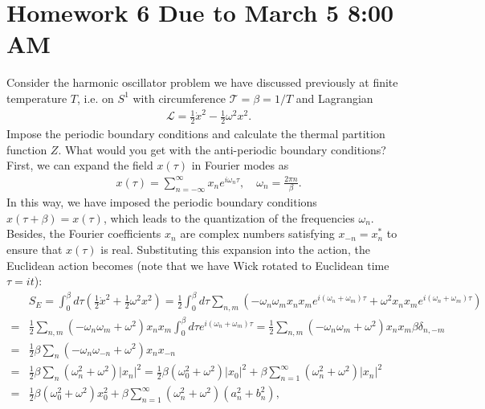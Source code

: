 \section*{Homework 6 Due to March 5 8:00 AM}
Consider the harmonic oscillator problem we have discussed previously at finite temperature $T$, i.e. on $S^1$ with circumference $\mathcal{T}=\beta = 1/T$ and Lagrangian 
\begin{align}
    \mathcal{L} = \frac{1}{2} \dot{x}^2 - \frac{1}{2} \omega^2 x^2.    
\end{align}
Impose the periodic boundary conditions and calculate the thermal partition function $Z$. What would you get with the anti-periodic boundary conditions?
\answer{}
First, we can expand the field $x(\tau)$ in Fourier modes as
\begin{align}
    x(\tau) = \sum_{n=-\infty}^{\infty} x_n e^{i \omega_n \tau}, \quad \omega_n = \frac{2\pi n}{\beta}.
\end{align}
In this way, we have imposed the periodic boundary conditions $x(\tau + \beta) = x(\tau)$, which leads to the quantization of the frequencies $\omega_n$. Besides, the Fourier coefficients $x_n$ are complex numbers satisfying $x_{-n} = x_n^*$ to ensure that $x(\tau)$ is real. Substituting this expansion into the action, the Euclidean action becomes (note that we have Wick rotated to Euclidean time $\tau = it$):
\begin{align}
    &S_E = \int_0^\beta d\tau \left( \frac{1}{2} \dot{x}^2 + \frac{1}{2} \omega^2 x^2 \right) = \frac{1}{2} \int_0^\beta d\tau \sum_{n,m} \left( -\omega_n \omega_m x_n x_m e^{i (\omega_n + \omega_m) \tau} + \omega^2 x_n x_m e^{i (\omega_n + \omega_m) \tau} \right) \\
    =& \frac{1}{2} \sum_{n,m} \left( -\omega_n \omega_m + \omega^2 \right) x_n x_m \int_0^\beta d\tau e^{i (\omega_n + \omega_m) \tau} = \frac{1}{2} \sum_{n,m} \left( -\omega_n \omega_m + \omega^2 \right) x_n x_m \beta \delta_{n,-m} \\
    =& \frac{1}{2}\beta \sum_{n}\left( -\omega_n \omega_{-n} + \omega^2 \right) x_n x_{-n} \\
    =& \frac{1}{2}\beta \sum_{n} \left( \omega_n^2 + \omega^2 \right) |x_n|^2 = \frac{1}{2}\beta (\omega_0^2 + \omega^2) |x_0|^2 + \beta\sum_{n=1}^{\infty} \left( \omega_n^2 + \omega^2 \right) |x_n|^2\\
    =& \frac{1}{2} \beta(\omega_0^2 + \omega^2) x_0^2+ \beta\sum_{n=1}^{\infty} \left( \omega_n^2 + \omega^2 \right) (a_n^2 + b_n^2),
\end{align}
